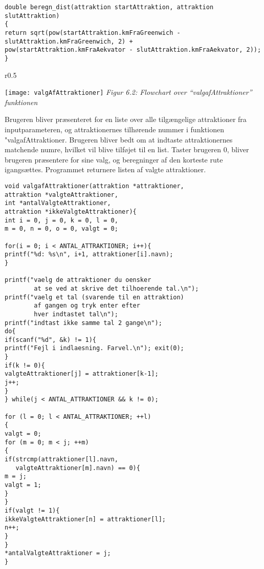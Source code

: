 \begin{lstlisting}
double beregn_dist(attraktion startAttraktion, attraktion slutAttraktion)
{
return sqrt(pow(startAttraktion.kmFraGreenwich - slutAttraktion.kmFraGreenwich, 2) + 
pow(startAttraktion.kmFraAekvator - slutAttraktion.kmFraAekvator, 2));
}
\end{lstlisting}

\begin{wrapfigure}{r}{0.5\textwidth}
	\vspace{0pt}
	\begin{center}
		\texttt{[image: valgAfAttraktioner]}\newline
		\textit{Figur 6.2: Flowchart over “valgafAttraktioner” funktionen}
	\end{center}
	\vspace{0pt}
	\vspace{0pt}
\end{wrapfigure}

Brugeren bliver præsenteret for en liste over alle tilgængelige attraktioner fra inputparameteren, og attraktionernes tilhørende nummer i funktionen "valgafAttraktioner. Brugeren bliver bedt om at indtaste attraktionernes matchende numre, hvilket vil blive tilføjet til en list. Taster brugeren 0, bliver brugeren præsentere for sine valg, og beregninger af den korteste rute igangsættes. Programmet returnere listen af valgte attraktioner. \newline

\begin{lstlisting}
void valgafAttraktioner(attraktion *attraktioner, 
attraktion *valgteAttraktioner, 
int *antalValgteAttraktioner, 
attraktion *ikkeValgteAttraktioner){
int i = 0, j = 0, k = 0, l = 0, 
m = 0, n = 0, o = 0, valgt = 0;

for(i = 0; i < ANTAL_ATTRAKTIONER; i++){
printf("%d: %s\n", i+1, attraktioner[i].navn);
}

printf("vaelg de attraktioner du oensker 
		at se ved at skrive det tilhoerende tal.\n");
printf("vaelg et tal (svarende til en attraktion) 
		af gangen og tryk enter efter 
		hver indtastet tal\n");
printf("indtast ikke samme tal 2 gange\n");
do{
if(scanf("%d", &k) != 1){
printf("Fejl i indlaesning. Farvel.\n"); exit(0);
}
if(k != 0){
valgteAttraktioner[j] = attraktioner[k-1];
j++;
}
} while(j < ANTAL_ATTRAKTIONER && k != 0);

for (l = 0; l < ANTAL_ATTRAKTIONER; ++l)
{
valgt = 0;
for (m = 0; m < j; ++m)
{
if(strcmp(attraktioner[l].navn, 
   valgteAttraktioner[m].navn) == 0){
m = j;
valgt = 1;
}	
}
if(valgt != 1){
ikkeValgteAttraktioner[n] = attraktioner[l];
n++;
}
}
*antalValgteAttraktioner = j;
}
\end{lstlisting}

